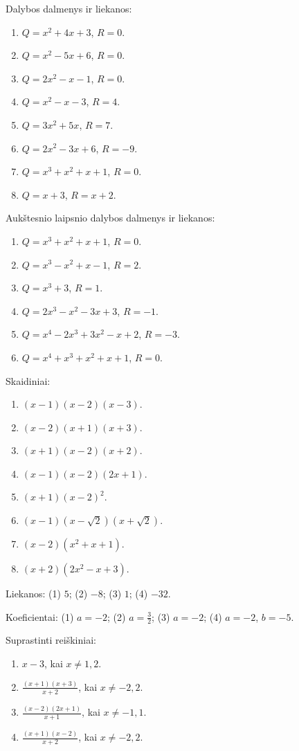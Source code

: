 \documentclass[11pt,a4paper]{scrartcl}
\newcommand{\uzd}[1]{\Needspace{5\baselineskip}\begin{problem}#1\end{problem}}
\begin{document}
\clearpage
\answerssection
\uzd{Dalybos dalmenys ir liekanos:
\begin{enumerate}[label=(\arabic*),leftmargin=*,itemsep=.3em]
\item \(Q=x^2+4x+3\), \(R=0\).
\item \(Q=x^2-5x+6\), \(R=0\).
\item \(Q=2x^2-x-1\), \(R=0\).
\item \(Q=x^2-x-3\), \(R=4\).
\item \(Q=3x^2+5x\), \(R=7\).
\item \(Q=2x^2-3x+6\), \(R=-9\).
\item \(Q=x^3+x^2+x+1\), \(R=0\).
\item \(Q=x+3\), \(R=x+2\).
\end{enumerate}}
\uzd{Aukštesnio laipsnio dalybos dalmenys ir liekanos:
\begin{enumerate}[label=(\arabic*),leftmargin=*,itemsep=.3em]
\item \(Q=x^3+x^2+x+1\), \(R=0\).
\item \(Q=x^3-x^2+x-1\), \(R=2\).
\item \(Q=x^3+3\), \(R=1\).
\item \(Q=2x^3-x^2-3x+3\), \(R=-1\).
\item \(Q=x^4-2x^3+3x^2-x+2\), \(R=-3\).
\item \(Q=x^4+x^3+x^2+x+1\), \(R=0\).
\end{enumerate}}
\uzd{Skaidiniai:
\begin{enumerate}[label=(\arabic*),leftmargin=*,itemsep=.3em]
\item \((x-1)(x-2)(x-3)\).
\item \((x-2)(x+1)(x+3)\).
\item \((x+1)(x-2)(x+2)\).
\item \((x-1)(x-2)(2x+1)\).
\item \((x+1)(x-2)^2\).
\item \((x-1)(x-\sqrt2)(x+\sqrt2)\).
\item \((x-2)(x^2+x+1)\).
\item \((x+2)(2x^2-x+3)\).
\end{enumerate}}
\uzd{Liekanos: (1) \(5\); (2) \(-8\); (3) \(1\); (4) \(-32\).}
\uzd{Koeficientai: (1) \(a=-2\); (2) \(a=\tfrac32\); (3) \(a=-2\); (4) \(a=-2\), \(b=-5\).}

\uzd{Suprastinti reiškiniai:
\begin{enumerate}[label=(\arabic*),leftmargin=*,itemsep=.3em]
\item \(x-3\), kai \(x\ne1,2\).
\item \(\displaystyle\frac{(x+1)(x+3)}{x+2}\), kai \(x\ne-2,2\).
\item \(\displaystyle\frac{(x-2)(2x+1)}{x+1}\), kai \(x\ne-1,1\).
\item \(\displaystyle\frac{(x+1)(x-2)}{x+2}\), kai \(x\ne-2,2\).
\end{enumerate}}
\end{document}
